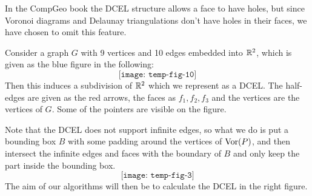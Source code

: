 \begin{rmk}
In the CompGeo book the DCEL structure allows a face to have holes, but since Voronoi diagrams and Delaunay triangulations don't have holes in their faces, we have chosen to omit this feature.
\end{rmk}

\begin{ex}
Consider a graph $G$ with 9 vertices and 10 edges embedded into $\mathbb{R}^2$, which is given as the blue figure in the following:
\[
  \texttt{[image: temp-fig-10]}
\]
Then this induces a subdivision of $\mathbb{R}^2$ which we represent as a DCEL. The half-edges are given as the red arrows, the faces as $f_1, f_2, f_3$ and the vertices are the vertices of $G$. Some of the pointers are visible on the figure.

\end{ex}

Note that the DCEL does not support infinite edges, so what we do is put a bounding box $B$ with some padding around the vertices of $\operatorname{Vor}(P)$, and then intersect the infinite edges and faces with the boundary of $B$ and only keep the part inside the bounding box.
\[
    \texttt{[image: temp-fig-3]}
\]
The aim of our algorithms will then be to calculate the DCEL in the right figure.